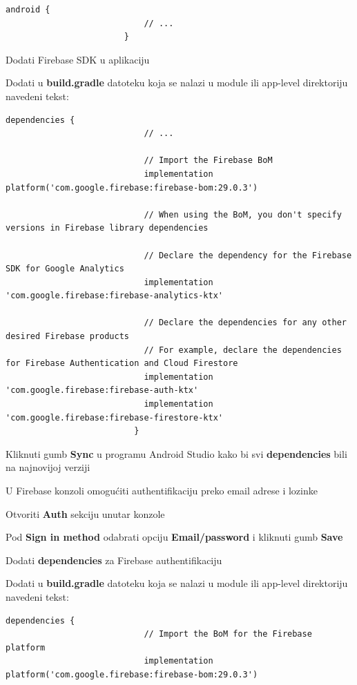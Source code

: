 \begin{packed_enum}
\begin{packed_enum}
\begin{lstlisting}[mathescape=true,breaklines=true,autogobble=true]
							android {
							// ...
						}
						\end{lstlisting}
				\end{packed_enum}
	
			\item Dodati Firebase SDK u aplikaciju
				\begin{packed_enum}   
					\item Dodati u \textbf{build.gradle} datoteku koja se nalazi u module ili app-level direktoriju navedeni tekst:      
						\begin{lstlisting}[mathescape=true,breaklines=true,autogobble=true]
							dependencies {
							// ...
				  
							// Import the Firebase BoM
							implementation platform('com.google.firebase:firebase-bom:29.0.3')
				  
							// When using the BoM, you don't specify versions in Firebase library dependencies
				  
							// Declare the dependency for the Firebase SDK for Google Analytics
							implementation 'com.google.firebase:firebase-analytics-ktx'
				  
							// Declare the dependencies for any other desired Firebase products
							// For example, declare the dependencies for Firebase Authentication and Cloud Firestore
							implementation 'com.google.firebase:firebase-auth-ktx'
							implementation 'com.google.firebase:firebase-firestore-ktx'
						  }
						\end{lstlisting} 
					\item Kliknuti gumb \textbf{Sync} u programu Android Studio kako bi svi \textbf{dependencies} bili na najnovijoj verziji
				\end{packed_enum} 
	
			\item U Firebase konzoli omogućiti authentifikaciju preko email adrese i lozinke
				\begin{packed_enum}
					\item Otvoriti \textbf{Auth} sekciju unutar konzole
					\item Pod \textbf{Sign in method} odabrati opciju \textbf{Email/password} i kliknuti gumb \textbf{Save}
				\end{packed_enum}
	
			\item Dodati \textbf{dependencies} za Firebase authentifikaciju
				\begin{packed_enum}
					\item Dodati u \textbf{build.gradle} datoteku koja se nalazi u module ili app-level direktoriju navedeni tekst:
					\begin{lstlisting}[mathescape=true,breaklines=true,autogobble=true]
						dependencies {
							// Import the BoM for the Firebase platform
							implementation platform('com.google.firebase:firebase-bom:29.0.3')
				

\end{lstlisting}
\end{packed_enum}
\end{packed_enum}
